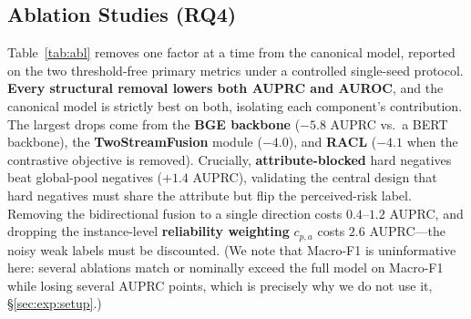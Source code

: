 \subsection{Ablation Studies (RQ4)}
\label{sec:exp:abl}

Table~\ref{tab:abl} removes one factor at a time from the canonical model,
reported on the two threshold-free primary metrics under a controlled
single-seed protocol. \textbf{Every structural removal lowers both AUPRC and
AUROC}, and the canonical model is strictly best on both, isolating each
component's contribution. The largest drops come from the \textbf{BGE backbone}
($-5.8$ AUPRC vs.\ a BERT backbone), the \textbf{TwoStreamFusion} module
($-4.0$), and \textbf{RACL} ($-4.1$ when the contrastive objective is removed).
Crucially, \textbf{attribute-blocked} hard negatives beat global-pool negatives
($+1.4$ AUPRC), validating the central design that hard negatives must share the
attribute but flip the perceived-risk label. Removing the bidirectional fusion
to a single direction costs $0.4$--$1.2$ AUPRC, and dropping the instance-level
\textbf{reliability weighting} $c_{p,a}$ costs $2.6$ AUPRC---the noisy weak
labels must be discounted. (We note that Macro-F1 is uninformative here: several
ablations match or nominally exceed the full model on Macro-F1 while losing
several AUPRC points, which is precisely why we do not use it,
\S\ref{sec:exp:setup}.)

